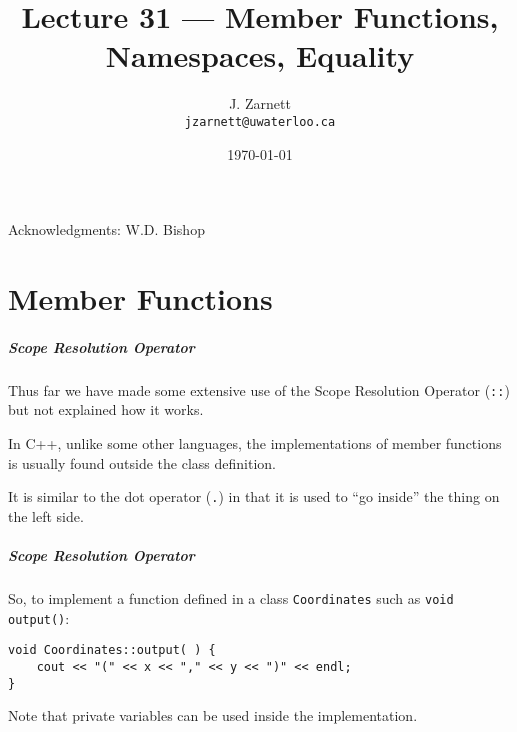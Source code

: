 

\title{Lecture 31 --- Member Functions, Namespaces, Equality}

\author{J. Zarnett\\
\texttt{jzarnett@uwaterloo.ca}}
\date{\today}



\begin{frame}
  \titlepage
  
  \begin{center}
  \small{Acknowledgments: W.D. Bishop}
  \end{center}
\end{frame}

\part{Member Functions}

\begin{frame}
\partpage
\end{frame}



\begin{frame}
\frametitle{Scope Resolution Operator}

Thus far we have made some extensive use of the Scope Resolution Operator (\alert{\texttt{::}}) but not explained how it works.

In C++, unlike some other languages, the implementations of member functions is usually found outside the class definition.

It is similar to the dot operator (\texttt{.}) in that it is used to ``go inside'' the thing on the left side.

\end{frame}


\begin{frame}[fragile]
\frametitle{Scope Resolution Operator}

So, to implement a function defined in a class \texttt{Coordinates} such as \texttt{void output()}:

\begin{verbatim}
void Coordinates::output( ) {
    cout << "(" << x << "," << y << ")" << endl;
}
\end{verbatim}

Note that private variables can be used inside the implementation.

\end{frame}


